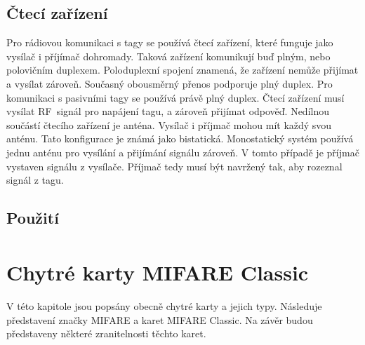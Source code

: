 \section{Čtecí zařízení}
Pro rádiovou komunikaci s tagy se používá čtecí zařízení, které funguje jako vysílač i příjímač dohromady. Taková zařízení komunikují buď plným, nebo polovičním duplexem. Poloduplexní spojení znamená, že zařízení nemůže přijímat a vysílat zároveň. Současný obousměrný přenos podporuje plný duplex. Pro komunikaci s pasivními tagy se používá právě plný duplex. Čtecí zařízení musí vysílat RF~signál pro napájení tagu, a zároveň přijímat odpověď.
Nedílnou součástí čtecího zařízení je anténa. Vysílač i příjmač mohou mít každý svou anténu. Tato konfigurace je známá jako bistatická. Monostatický systém používá jednu anténu pro vysílání a přijímání signálu zároveň. V tomto případě je příjmač vystaven signálu z vysílače. Příjmač tedy musí být navržený tak, aby rozeznal signál z tagu\cite{The_RF_in_RFID}.\par

\section{Použití}

              
\chapter{Chytré karty MIFARE Classic\textsuperscript{\textregistered}}
\label{chytre_karty}
V této kapitole jsou popsány obecně chytré karty a jejich typy. Následuje představení značky MIFARE a karet MIFARE Classic. Na závěr budou představeny některé zranitelnosti těchto karet.

